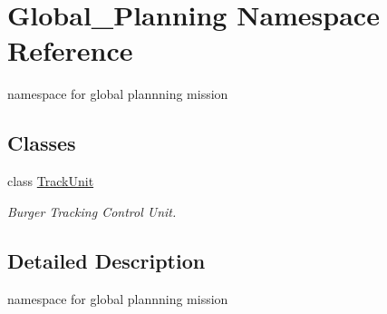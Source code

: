 \hypertarget{namespace_global___planning}{}\section{Global\+\_\+\+Planning Namespace Reference}
\label{namespace_global___planning}


namespace for global plannning mission  


\subsection*{Classes}
\begin{DoxyCompactItemize}
\item 
class \hyperlink{class_global___planning_1_1_track_unit}{Track\+Unit}
\begin{DoxyCompactList}\small\item\em Burger Tracking Control Unit. \end{DoxyCompactList}\end{DoxyCompactItemize}


\subsection{Detailed Description}
namespace for global plannning mission 